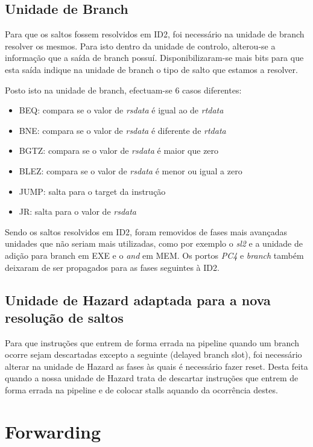 \documentclass[pdftex,12pt,a4paper]{report}
\begin{document}
\subsection{Unidade de Branch}

Para que os saltos fossem resolvidos em ID2, foi necessário na unidade de branch resolver os mesmos. Para isto dentro da unidade de controlo, alterou-se a informação que a saída de branch possuí. Disponibilizaram-se mais bits para que esta saída indique na unidade de branch o tipo de salto que estamos a resolver.

Posto isto na unidade de branch, efectuam-se 6 casos diferentes:

\begin{itemize}
\item BEQ: compara se o valor de \textit{rsdata} é igual ao de \textit{rtdata}
\item BNE: compara se o valor de \textit{rsdata} é diferente de \textit{rtdata} 
\item BGTZ: compara se o valor de \textit{rsdata} é maior que zero
\item BLEZ: compara se o valor de \textit{rsdata} é menor ou igual a zero
\item JUMP: salta para o target da instrução
\item JR: salta para o valor de \textit{rsdata}
\end{itemize} 

Sendo os saltos resolvidos em ID2, foram removidos de fases mais avançadas unidades que não seriam mais utilizadas, como por exemplo o \textit{sl2} e a unidade de adição para branch em EXE e o \textit{and} em MEM. Os portos \textit{PC4} e \textit{branch} também deixaram de ser propagados para as fases seguintes à ID2.

\subsection{Unidade de Hazard adaptada para a nova resolução de saltos}

Para que instruções que entrem de forma errada na pipeline quando um branch ocorre sejam descartadas excepto a seguinte (delayed branch slot), foi necessário alterar na unidade de Hazard as fases às quais é necessário fazer reset. Desta feita quando a nossa unidade de Hazard trata de descartar instruções que entrem de forma errada na pipeline e de colocar stalls aquando da ocorrência destes.

\section{Forwarding}
\end{document}
